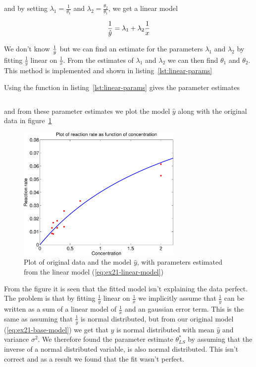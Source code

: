 and by setting $\lambda_1 = \frac{1}{\theta_1}$ and $\lambda_2 = \frac{\theta_2}{\theta_1}$, we get a linear model

\begin{equation}\label{eq:ex21-linear-model}
    \frac{1}{\hat{y}} = \lambda_1 + \lambda_2 \frac{1}{x}
\end{equation}

We don't know $\frac{1}{\hat{y}}$ but we can find an estimate for the parameters $\lambda_1$ and $\lambda_2$ by fitting $\frac{1}{y}$ linear on $\frac{1}{x}$. From the estimates of $\lambda_1$ and $\lambda_2$ we can then find $\theta_1$ and $\theta_2$. This method is implemented and shown in listing~\ref{lst:linear-params}



Using the function in listing~\ref{lst:linear-params} gives the parameter estimates

\begin{equation*}
    
\end{equation*}

and from these parameter estimates we plot the model $\hat{y}$ along with the original data in figure~\ref{fig:data-and-linear-model}

\begin{figure}[!ht]
    \centering
    \includegraphics[width=80mm]{../media/ex21-linear-model.pdf}
    \caption{Plot of original data and the model $\hat{y}$, with parameters estimated from the linear model (\ref{eq:ex21-linear-model})}
    \label{fig:data-and-linear-model}
\end{figure}

From the figure it is seen that the fitted model isn't explaining the data perfect. The problem is that by fitting $\frac{1}{y}$ linear on $\frac{1}{x}$ we implicitly assume that $\frac{1}{y}$ can be written as a sum of a linear model of $\frac{1}{x}$ and an gaussian error term. This is the same as assuming that $\frac{1}{y}$ is normal distributed, but from our original model (\ref{eq:ex21-base-model}) we get that $y$ is normal distributed with mean $\hat{y}$ and variance $\sigma^2$. We therefore found the parameter estimate $\theta_{LS}^*$ by assuming that the inverse of a normal distributed variable, is also normal distributed. This isn't correct and as a result we found that the fit wasn't perfect.


